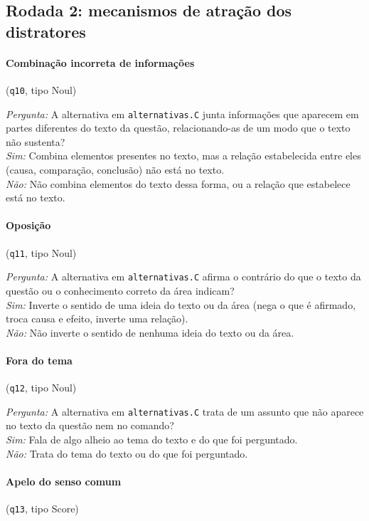 \subsection{Rodada 2: mecanismos de atração dos distratores}

\paragraph{Combinação incorreta de informações} (\texttt{q10}, tipo Noul)

\textit{Pergunta:} A alternativa em \texttt{alternativas.C} junta informações que aparecem em partes diferentes do texto da questão, relacionando-as de um modo que o texto não sustenta?\\
\textit{Sim:} Combina elementos presentes no texto, mas a relação estabelecida entre eles (causa, comparação, conclusão) não está no texto.\\
\textit{Não:} Não combina elementos do texto dessa forma, ou a relação que estabelece está no texto.

\paragraph{Oposição} (\texttt{q11}, tipo Noul)

\textit{Pergunta:} A alternativa em \texttt{alternativas.C} afirma o contrário do que o texto da questão ou o conhecimento correto da área indicam?\\
\textit{Sim:} Inverte o sentido de uma ideia do texto ou da área (nega o que é afirmado, troca causa e efeito, inverte uma relação).\\
\textit{Não:} Não inverte o sentido de nenhuma ideia do texto ou da área.

\paragraph{Fora do tema} (\texttt{q12}, tipo Noul)

\textit{Pergunta:} A alternativa em \texttt{alternativas.C} trata de um assunto que não aparece no texto da questão nem no comando?\\
\textit{Sim:} Fala de algo alheio ao tema do texto e do que foi perguntado.\\
\textit{Não:} Trata do tema do texto ou do que foi perguntado.

\paragraph{Apelo do senso comum} (\texttt{q13}, tipo Score)

